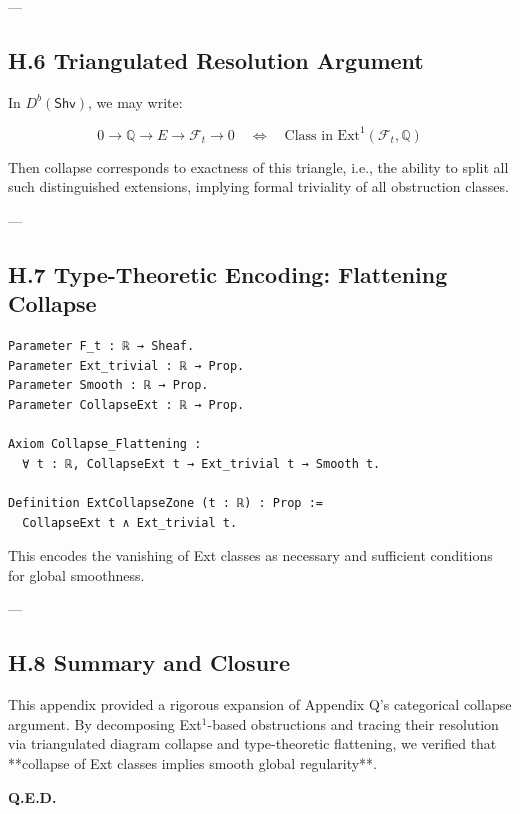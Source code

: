 \documentclass[11pt]{article}
\begin{document}
---

\subsection*{H.6 Triangulated Resolution Argument}

In \( D^b(\mathsf{Shv}) \), we may write:

\[
0 \to \mathbb{Q} \to E \to \mathcal{F}_t \to 0
\quad \Leftrightarrow \quad \text{Class in } \mathrm{Ext}^1(\mathcal{F}_t, \mathbb{Q})
\]

Then collapse corresponds to exactness of this triangle, i.e.,  
the ability to split all such distinguished extensions,  
implying formal triviality of all obstruction classes.

---

\subsection*{H.7 Type-Theoretic Encoding: Flattening Collapse}

\begin{lstlisting}[language=Coq, caption=Ext-Class Collapse Type Encoding]
Parameter F_t : ℝ → Sheaf.
Parameter Ext_trivial : ℝ → Prop.
Parameter Smooth : ℝ → Prop.
Parameter CollapseExt : ℝ → Prop.

Axiom Collapse_Flattening :
  ∀ t : ℝ, CollapseExt t → Ext_trivial t → Smooth t.

Definition ExtCollapseZone (t : ℝ) : Prop :=
  CollapseExt t ∧ Ext_trivial t.
\end{lstlisting}

This encodes the vanishing of Ext classes as necessary and sufficient conditions for global smoothness.

---

\subsection*{H.8 Summary and Closure}

This appendix provided a rigorous expansion of Appendix Q’s categorical collapse argument.  
By decomposing Ext\(^1\)-based obstructions and tracing their resolution via  
triangulated diagram collapse and type-theoretic flattening,  
we verified that **collapse of Ext classes implies smooth global regularity**.

\begin{flushright}
\textbf{Q.E.D.}
\end{flushright}
\end{document}
